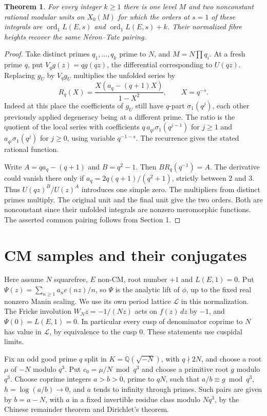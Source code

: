 \documentclass[11pt]{article}
\newtheorem{theorem}{Theorem}[section]\newtheorem{lemma}[theorem]{Lemma}
\newcommand{\Q}{\mathbb Q}\newcommand{\Z}{\mathbb Z}\newcommand{\R}{\mathbb R}\newcommand{\C}{\mathbb C}
\newcommand{\ord}{\operatorname{ord}}
\begin{document}
\begin{theorem}
For every integer $k\ge1$ there is one level $M$ and two nonconstant rational modular units on $X_0(M)$ for which the orders at $s=1$ of these integrals are $\ord_1 L(E,s)$ and $\ord_1 L(E,s)+k$. Their normalized fibre heights recover the same N\'eron--Tate pairing.
\end{theorem}
\begin{proof}
Take distinct primes $q_1,\ldots,q_k$ prime to $N$, and $M=N\prod q_i$. At a fresh prime $q$, put $V_q g(z)=qg(qz)$, the differential corresponding to $U(qz)$. Replacing $g_U$ by $V_q g_U$ multiplies the unfolded series by
\[
 R_q(X)=\frac{X(a_q-(q+1)X)}{1-X^2},
 \qquad X=q^{-s}.
\]
Indeed at this place the coefficients of $g_U$ still have $q$-part $\sigma_1(q^j)$, each other previously applied degeneracy being at a different prime. The ratio is the quotient of the local series with coefficients $q\,a_{q^j}\sigma_1(q^{j-1})$ for $j\ge1$ and $a_{q^j}\sigma_1(q^j)$ for $j\ge0$, using variable $q^{-1-s}$. The recurrence gives the stated rational function.

Write $A=qa_q-(q+1)$ and $B=q^2-1$. Then $BR_q(q^{-1})=A$. The derivative could vanish there only if $a_q=2q(q+1)/(q^2+1)$, strictly between 2 and 3. Thus $U(qz)^B/U(z)^A$ introduces one simple zero. The multipliers from distinct primes multiply. The original unit and the final unit give the two orders. Both are nonconstant since their unfolded integrals are nonzero meromorphic functions. The asserted common pairing follows from Section 1.
\end{proof}

\section{CM samples and their conjugates}
Here assume $N$ squarefree, $E$ non-CM, root number $+1$ and $L(E,1)=0$. Put $\Psi(z)=\sum_{n\ge1}a_n e(nz)/n$, so $\Psi$ is the analytic lift of $\phi$, up to the fixed real nonzero Manin scaling. We use its own period lattice $\mathcal L$ in this normalization. The Fricke involution $W_N z=-1/(Nz)$ acts on $f(z)\,dz$ by $-1$, and $\Psi(0)=L(E,1)=0$. In particular every cusp of denominator coprime to $N$ has value in $\mathcal L$, by equivalence to the cusp 0. These statements use cuspidal limits.

Fix an odd good prime $q$ split in $K=\Q(\sqrt{-N})$, with $q\nmid2N$, and choose a root $\mu$ of $-N$ modulo $q^3$. Put $c_0=\mu/N\bmod q^3$ and choose a primitive root $g$ modulo $q^3$. Choose coprime integers $a>b>0$, prime to $qN$, such that $a/b\equiv g\bmod q^3$, $h=\log(a/b)\to0$, and $a$ tends to infinity through primes. Such pairs are given by $b=a-N$, with $a$ in a fixed invertible residue class modulo $Nq^3$, by the Chinese remainder theorem and Dirichlet's theorem.
\end{document}
